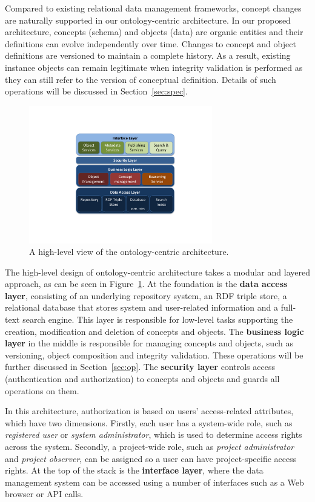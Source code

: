 \documentclass[preprint,12pt]{elsarticle}
\begin{document}
Compared to existing relational data management frameworks, concept changes are naturally supported in our ontology-centric architecture. In our proposed architecture, concepts (schema) and objects (data) are organic entities and their definitions can evolve independently over time. Changes to concept and object definitions are versioned to maintain a complete history. As a result, existing instance objects can remain legitimate when integrity validation is performed as they can still refer to the version of conceptual definition. Details of such operations will be discussed in Section~\ref{sec:spec}.

\begin{figure}[htb]
\centering
\includegraphics[trim = 60mm 30mm 50mm 36mm, clip,height=60mm]{architecture.pdf}
\vspace{-20pt} \caption{A high-level view of the ontology-centric architecture.}\label{fig:arch}
\end{figure}

The high-level design of ontology-centric architecture takes a modular and layered approach, as can be seen in Figure~\ref{fig:arch}. At the foundation is the \textbf{data access layer}, consisting of an underlying repository system, an RDF triple store, a relational database that stores system and user-related information and a full-text search engine. This layer is responsible for low-level tasks supporting the creation, modification and deletion of concepts and objects. The \textbf{business logic layer} in the middle is responsible for managing concepts and objects, such as versioning, object composition and integrity validation. These operations will be further discussed in Section~\ref{sec:op}. The \textbf{security layer} controls access (authentication and authorization) to concepts and objects and guards all operations on them. 

In this architecture, authorization is based on users' access-related attributes, which have two dimensions. Firstly, each user has a system-wide role, such as \emph{registered user} or \emph{system administrator}, which is used to determine access rights across the system. Secondly, a project-wide role, such as \emph{project administrator} and \emph{project observer}, can be assigned so a user can have project-specific access rights. At the top of the stack is the \textbf{interface layer}, where the data management system can be accessed using a number of interfaces such as a Web browser or API calls. 
\end{document}
